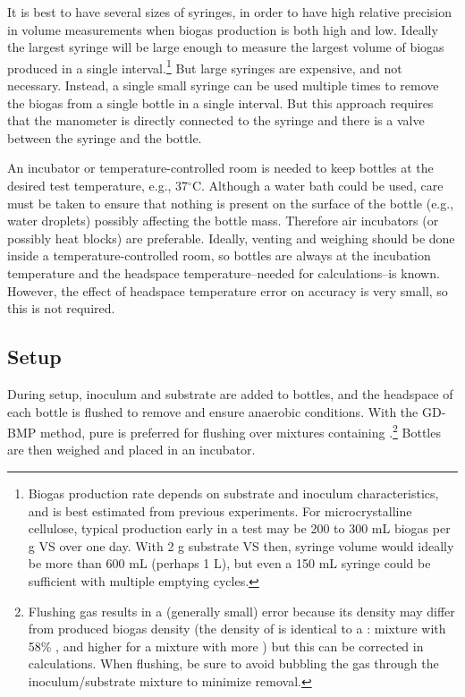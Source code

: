 \documentclass[]{article}
\begin{document}
It is best to have several sizes of syringes, in order to have high relative precision in volume measurements when biogas production is both high and low.
Ideally the largest syringe will be large enough to measure the largest volume of biogas produced in a single interval.\footnote{
  Biogas production rate depends on substrate and inoculum characteristics, and is best estimated from previous experiments.
  For microcrystalline cellulose, typical production early in a test may be 200 to 300 mL biogas per g VS over one day. 
  With 2 g substrate VS then, syringe volume would ideally be more than 600 mL (perhaps 1 L), but even a 150 mL syringe could be sufficient with multiple emptying cycles.
}
But large syringes are expensive, and not necessary.
Instead, a single small syringe can be used multiple times to remove the biogas from a single bottle in a single interval.
But this approach requires that the manometer is directly connected to the syringe and there is a valve between the syringe and the bottle.

An incubator or temperature-controlled room is needed to keep bottles at the desired test temperature, e.g., 37$^\circ$C.
Although a water bath could be used, care must be taken to ensure that nothing is present on the surface of the bottle (e.g., water droplets) possibly affecting the bottle mass.
Therefore air incubators (or possibly heat blocks) are preferable.
Ideally, venting and weighing should be done inside a temperature-controlled room, so bottles are always at the incubation temperature and the headspace temperature--needed for calculations--is known.  
However, the effect of headspace temperature error on accuracy is very small, so this is not required.

\subsection{Setup}
During setup, inoculum and substrate are added to bottles, and the headspace of each bottle is flushed to remove  and ensure anaerobic conditions. 
With the GD-BMP method, pure  is preferred for flushing over mixtures containing .\footnote{
Flushing gas results in a (generally small) error because its density may differ from produced biogas density (the density of  is identical to a : mixture with 58\% , and higher for a mixture with more ) but this can be corrected in calculations. 
When flushing, be sure to avoid bubbling the gas through the inoculum/substrate mixture to minimize  removal.
}
Bottles are then weighed and placed in an incubator.
\end{document}
